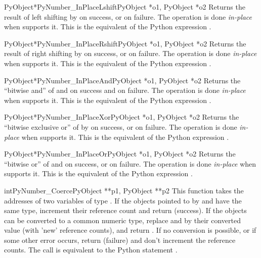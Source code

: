 \documentclass{manual}
\begin{document}
\begin{cfuncdesc}{PyObject*}{PyNumber_InPlaceLshift}{PyObject *o1, PyObject *o2}
Returns the result of left shifting  by  on success, or
\NULL{} on failure.  The operation is done \emph{in-place} when 
supports it.  This is the equivalent of the Python expression .
\end{cfuncdesc}


\begin{cfuncdesc}{PyObject*}{PyNumber_InPlaceRshift}{PyObject *o1, PyObject *o2}
Returns the result of right shifting  by  on success, or
\NULL{} on failure.  The operation is done \emph{in-place} when 
supports it.  This is the equivalent of the Python expression .
\end{cfuncdesc}


\begin{cfuncdesc}{PyObject*}{PyNumber_InPlaceAnd}{PyObject *o1, PyObject *o2}
Returns the ``bitwise and'' of  and  on success
and \NULL{} on failure. The operation is done \emph{in-place} when
 supports it.  This is the equivalent of the Python expression
.
\end{cfuncdesc}


\begin{cfuncdesc}{PyObject*}{PyNumber_InPlaceXor}{PyObject *o1, PyObject *o2}
Returns the ``bitwise exclusive or'' of  by  on success, or
\NULL{} on failure.  The operation is done \emph{in-place} when 
supports it.  This is the equivalent of the Python expression .
\end{cfuncdesc}

\begin{cfuncdesc}{PyObject*}{PyNumber_InPlaceOr}{PyObject *o1, PyObject *o2}
Returns the ``bitwise or'' of  and  on success, or \NULL{}
on failure.  The operation is done \emph{in-place} when  supports
it.  This is the equivalent of the Python expression .
\end{cfuncdesc}

\begin{cfuncdesc}{int}{PyNumber_Coerce}{PyObject **p1, PyObject **p2}
This function takes the addresses of two variables of type
.  If the objects pointed to by  and
 have the same type, increment their reference count
and return  (success). If the objects can be converted to a
common numeric type, replace  and  by their
converted value (with 'new' reference counts), and return .
If no conversion is possible, or if some other error occurs, return
 (failure) and don't increment the reference counts.  The
call  is equivalent to the Python
statement .
\end{cfuncdesc}
\end{document}
